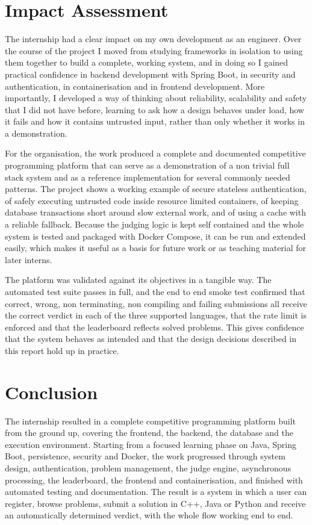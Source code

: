 \documentclass[12pt,a4paper]{report}
\begin{document}
\chapter*{Impact Assessment}

The internship had a clear impact on my own development as an engineer. Over the course of the project I moved from studying frameworks in isolation to using them together to build a complete, working system, and in doing so I gained practical confidence in backend development with Spring Boot, in security and authentication, in containerisation and in frontend development. More importantly, I developed a way of thinking about reliability, scalability and safety that I did not have before, learning to ask how a design behaves under load, how it fails and how it contains untrusted input, rather than only whether it works in a demonstration.

For the organisation, the work produced a complete and documented competitive programming platform that can serve as a demonstration of a non trivial full stack system and as a reference implementation for several commonly needed patterns. The project shows a working example of secure stateless authentication, of safely executing untrusted code inside resource limited containers, of keeping database transactions short around slow external work, and of using a cache with a reliable fallback. Because the judging logic is kept self contained and the whole system is tested and packaged with Docker Compose, it can be run and extended easily, which makes it useful as a basis for future work or as teaching material for later interns.

The platform was validated against its objectives in a tangible way. The automated test suite passes in full, and the end to end smoke test confirmed that correct, wrong, non terminating, non compiling and failing submissions all receive the correct verdict in each of the three supported languages, that the rate limit is enforced and that the leaderboard reflects solved problems. This gives confidence that the system behaves as intended and that the design decisions described in this report hold up in practice.

\chapter*{Conclusion}

The internship resulted in a complete competitive programming platform built from the ground up, covering the frontend, the backend, the database and the execution environment. Starting from a focused learning phase on Java, Spring Boot, persistence, security and Docker, the work progressed through system design, authentication, problem management, the judge engine, asynchronous processing, the leaderboard, the frontend and containerisation, and finished with automated testing and documentation. The result is a system in which a user can register, browse problems, submit a solution in C++, Java or Python and receive an automatically determined verdict, with the whole flow working end to end.
\end{document}
